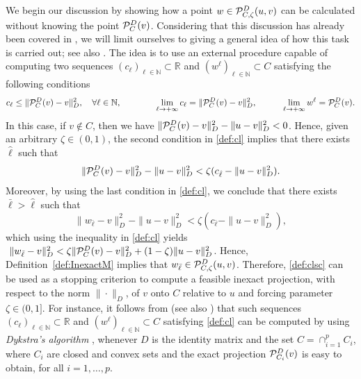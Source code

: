 We begin our discussion by showing how a point $w\in {\cal P}_{C, \zeta}^{D}(u,v)$ can be calculated  without knowing the point ${\cal P}_{C}^{D}(v)$.   Considering that this discussion has already been covered in \cite[Section~3,  Algorithm 3.1]{BirginMartinezRaydan2003},  we will limit ourselves to giving a general idea of how this task is carried out; see also \cite[Section~5.1]{Bonettini2016}.   The idea is to use an external procedure capable of computing two  sequences  $(c_\ell)_{\ell\in\mathbb{N}}\subset \mathbb{R}$  and   $(w^\ell)_{\ell\in\mathbb{N}}\subset C$ satisfying the following  conditions
\begin{equation}\label{def:cl}
	c_\ell \leq \|{\cal P}_{C}^{D}(v)-v\|_D^2,\quad  \forall\ell\in\mathbb{N}, \qquad \qquad \lim_{\ell \to +\infty} c_\ell = \|{\cal P}_{C}^{D}(v)-v\|_D^2, \qquad \quad   \lim_{\ell\to +\infty} w^\ell = {\cal P}_{C}^{D}(v).
\end{equation}
In this case,   if  $v\notin C$, then   we have $ \|{\cal P}_{C}^{D}(v)-v\|_D^2- \|u-v\|_D^2<0$. Hence,   given an arbitrary $ \zeta\in (0,1)$,  the second condition in \eqref{def:cl} implies  that   there exists $\hat{\ell}$ such that
$$
	\|{\cal P}_{C}^{D}(v)-v\|_D^2- \|u-v\|_D^2< \zeta (c_{\hat{\ell}}- \|u-v\|_D^2).
$$
Moreover, by using the last condition in \eqref{def:cl}, we conclude that   there exists $\bar{\ell}>\hat{\ell}$ such that
\begin{equation}\label{def:clsc}
	\|w_{\bar{\ell}}-v\|_D^2- \|u-v\|_D^2< \zeta (c_{\bar{\ell}}- \|u-v\|_D^2),
\end{equation}
which using   the inequality  in \eqref{def:cl} yields  $ \ \|w_{\bar{\ell}}-v\|_D^2<  \zeta \|{\cal P}_{C}^{D}(v)-v\|_D^2  +(1-\zeta) \|u-v\|_D^2$.
Hence, Definition~\ref{def:InexactM} implies that  $w_{\bar{\ell}}\in  {\cal P}_{C, \zeta}^{D}(u, v)$.   Therefore,   \eqref{def:clsc}  can be used as a stopping criterion to compute  a  feasible inexact projection,  with respect to the norm $\| \cdot \|_{D}$,  of $v$ onto $C$ relative to $u$ and forcing parameter $\zeta\in (0, 1]$. For instance,  it follows from   \cite[Theorem~3.2, Lemma~3.1]{BirginMartinezRaydan2003} (see also \cite{BirginRaydan2005}) that  such sequences  $(c_\ell)_{\ell\in\mathbb{N}}\subset \mathbb{R}$  and   $(w^\ell)_{\ell\in\mathbb{N}}\subset C$  satisfying  \eqref{def:cl}  can be computed by using   {\it Dykstra's algorithm} \cite{Dykstra1986, Dykstra1983}, whenever  $D$ is the identity matrix  and the set $C=\cap_{i=1}^p C_i$, where $C_i$ are closed and convex sets and the exact projection  ${\cal P}_{C_i}^{D}(v)$ is easy to obtain, for all $i=1,\dots,p$.

